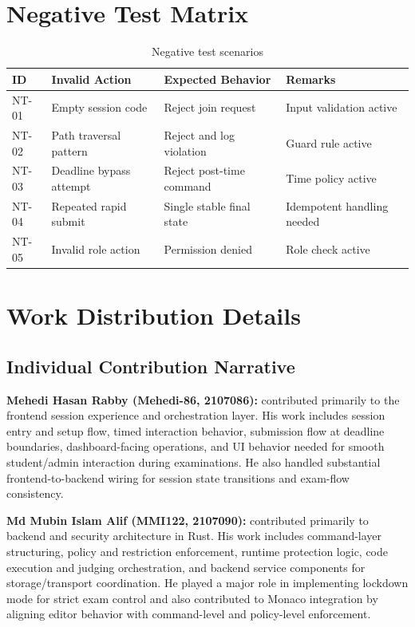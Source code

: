 \documentclass[12pt,a4paper]{report}
\begin{document}
	\section{Negative Test Matrix}
	\begin{table}[htbp]
		\centering
		\caption{Negative test scenarios}
		\begin{tabular}{|p{}|p{}|p{}|p{}|}
			\hline
			\textbf{ID} & \textbf{Invalid Action} & \textbf{Expected Behavior} & \textbf{Remarks} \\
			\hline
			NT-01 & Empty session code & Reject join request & Input validation active \\
			\hline
			NT-02 & Path traversal pattern & Reject and log violation & Guard rule active \\
			\hline
			NT-03 & Deadline bypass attempt & Reject post-time command & Time policy active \\
			\hline
			NT-04 & Repeated rapid submit & Single stable final state & Idempotent handling needed \\
			\hline
			NT-05 & Invalid role action & Permission denied & Role check active \\
			\hline
		\end{tabular}
	\end{table}
	
	\section{Work Distribution Details}
	\subsection{Individual Contribution Narrative}
	\textbf{Mehedi Hasan Rabby (Mehedi-86, 2107086):} contributed primarily to the frontend session experience and orchestration layer. His work includes session entry and setup flow, timed interaction behavior, submission flow at deadline boundaries, dashboard-facing operations, and UI behavior needed for smooth student/admin interaction during examinations. He also handled substantial frontend-to-backend wiring for session state transitions and exam-flow consistency.
	
	\textbf{Md Mubin Islam Alif (MMI122, 2107090):} contributed primarily to backend and security architecture in Rust. His work includes command-layer structuring, policy and restriction enforcement, runtime protection logic, code execution and judging orchestration, and backend service components for storage/transport coordination. He played a major role in implementing lockdown mode for strict exam control and also contributed to Monaco integration by aligning editor behavior with command-level and policy-level enforcement.
	
\end{document}
